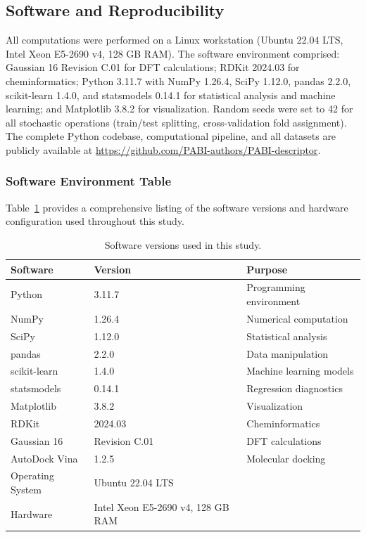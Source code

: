 \documentclass[12pt,a4paper]{article}
\begin{document}
\subsection{Software and Reproducibility}

All computations were performed on a Linux workstation (Ubuntu 22.04 LTS, Intel Xeon E5-2690 v4, 128 GB RAM). The software environment comprised: Gaussian 16 Revision C.01\cite{frisch2016gaussian} for DFT calculations; RDKit 2024.03\cite{rdkit2024} for cheminformatics; Python 3.11.7 with NumPy 1.26.4, SciPy 1.12.0, pandas 2.2.0, scikit-learn 1.4.0, and statsmodels 0.14.1 for statistical analysis and machine learning; and Matplotlib 3.8.2 for visualization. Random seeds were set to 42 for all stochastic operations (train/test splitting, cross-validation fold assignment). The complete Python codebase, computational pipeline, and all datasets are publicly available at \url{https://github.com/PABI-authors/PABI-descriptor}.

\subsubsection{Software Environment Table}

Table~\ref{tab:software_env} provides a comprehensive listing of the software versions and hardware configuration used throughout this study.

\begin{table}[H]
\centering
\caption{Software versions used in this study.}
\label{tab:software_env}
\begin{tabular}{@{}lll@{}}
\toprule
\textbf{Software} & \textbf{Version} & \textbf{Purpose} \\
\midrule
Python & 3.11.7 & Programming environment \\
NumPy & 1.26.4 & Numerical computation \\
SciPy & 1.12.0 & Statistical analysis \\
pandas & 2.2.0 & Data manipulation \\
scikit-learn & 1.4.0 & Machine learning models \\
statsmodels & 0.14.1 & Regression diagnostics \\
Matplotlib & 3.8.2 & Visualization \\
RDKit & 2024.03 & Cheminformatics \\
Gaussian 16 & Revision C.01 & DFT calculations \\
AutoDock Vina & 1.2.5 & Molecular docking \\
\midrule
Operating System & Ubuntu 22.04 LTS & \\
Hardware & Intel Xeon E5-2690 v4, 128 GB RAM & \\
\bottomrule
\end{tabular}
\end{table}
\end{document}
